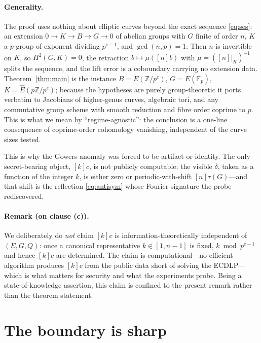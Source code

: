 \documentclass[11pt]{article}
\theoremstyle{definition}
\newcommand{\Fp}{\mathbb{F}_p}
\newcommand{\Z}{\mathbb{Z}}
\newcommand{\Ehat}{\widehat{E}}
\begin{document}
\paragraph{Generality.} The proof uses nothing about elliptic curves
beyond the exact sequence \eqref{eq:ses}: an extension
$0\to K\to B\to G\to0$ of abelian groups with $G$ finite of order $n$, $K$
a $p$-group of exponent dividing $p^{e-1}$, and $\gcd(n,p)=1$. Then $n$ is
invertible on $K$, so $H^2(G,K)=0$, the retraction $b\mapsto\mu([n]b)$
with $\mu=([n]|_K)^{-1}$ splits the sequence, and the lift error is a
coboundary carrying no extension data. Theorem~\ref{thm:main} is the
instance $B=E(\Z/p^e)$, $G=E(\Fp)$, $K=\Ehat(p\Z/p^e)$; because the
hypotheses are purely group-theoretic it ports verbatim to Jacobians of
higher-genus curves, algebraic tori, and any commutative group scheme with
smooth reduction and fibre order coprime to $p$. This is what we mean by
``regime-agnostic'': the conclusion is a one-line consequence of
coprime-order cohomology vanishing, independent of the curve sizes tested.

This is why the Gowers anomaly was forced to be artifact-or-identity. The
only secret-bearing object, $[k]c$, is not publicly computable; the
visible $\delta$, taken as a function of the integer $k$, is either zero
or periodic-with-shift $[n]\tau(G)$---and that shift is the reflection
\eqref{eq:antisym} whose Fourier signature the probe rediscovered.

\paragraph{Remark (on clause (c)).} We deliberately do \emph{not} claim
$[k]c$ is information-theoretically independent of $(E,G,Q)$: once a
canonical representative $k\in[1,n-1]$ is fixed, $k\bmod p^{e-1}$ and
hence $[k]c$ are determined. The claim is computational---no efficient
algorithm produces $[k]c$ from the public data short of solving the
ECDLP---which is what matters for security and what the experiments
probe. Being a state-of-knowledge assertion, this claim is confined to
the present remark rather than the theorem statement.

\section{The boundary is sharp}\label{sec:boundary}
\end{document}

